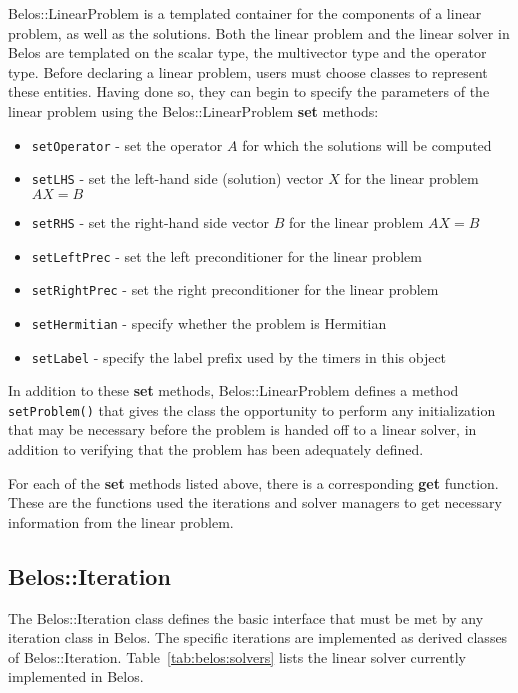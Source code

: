 Belos::LinearProblem is a templated container for the components of a linear problem, 
as well as the solutions.  Both the linear problem and the linear solver in Belos are 
templated on the scalar type, the multivector type and the operator type. Before
declaring a linear problem, users must choose classes to represent these
entities. Having done so, they can begin to specify the parameters of the
linear problem using the Belos::LinearProblem \textbf{set} methods:
\begin{itemize}
\item \verb!setOperator! - set the operator $A$ for which the solutions will be computed
\item \verb!setLHS! - set the left-hand side (solution) vector $X$ for the linear problem $A X = B$
\item \verb!setRHS! - set the right-hand side vector $B$ for the linear problem $A X = B$
\item \verb!setLeftPrec! - set the left preconditioner for the linear problem
\item \verb!setRightPrec! - set the right preconditioner for the linear problem
\item \verb!setHermitian! - specify whether the problem is Hermitian
\item \verb!setLabel! - specify the label prefix used by the timers in this object
\end{itemize}
In addition to these \textbf{set} methods, Belos::LinearProblem defines
a method \verb!setProblem()! that gives the class the opportunity to perform
any initialization that may be necessary before the problem is handed off 
to a linear solver, in addition to verifying that the problem has been adequately defined. 

For each of the \textbf{set} methods listed above, there is a corresponding
\textbf{get} function. These are the functions used the iterations and solver managers to 
get necessary information from the linear problem. 

\subsection{Belos::Iteration}
\label{sec:belos:iterativesolver}

The Belos::Iteration class defines the basic interface that must be
met by any iteration class in Belos. The specific iterations are
implemented as derived classes of Belos::Iteration.
Table~\ref{tab:belos:solvers} lists the linear solver currently implemented in
Belos.  

